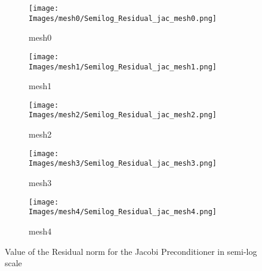 \begin{figure}[htbp]
    \centering
    \begin{subfigure}{0.45\textwidth}
        \centering
        \texttt{[image: Images/mesh0/Semilog\_Residual\_jac\_mesh0.png]}
        \caption{mesh0}
    \end{subfigure}
    \hfill
    \begin{subfigure}{0.45\textwidth}
        \centering
        \texttt{[image: Images/mesh1/Semilog\_Residual\_jac\_mesh1.png]}
        \caption{mesh1}
    \end{subfigure}
    \hfill
    \begin{subfigure}{0.45\textwidth}
        \centering
        \texttt{[image: Images/mesh2/Semilog\_Residual\_jac\_mesh2.png]}
        \caption{mesh2}
    \end{subfigure}

    \vspace{1em} %

    \begin{subfigure}{0.45\textwidth}
        \centering
        \texttt{[image: Images/mesh3/Semilog\_Residual\_jac\_mesh3.png]}
        \caption{mesh3}
    \end{subfigure}
    \hfill
    \begin{subfigure}{0.45\textwidth}
        \centering
        \texttt{[image: Images/mesh4/Semilog\_Residual\_jac\_mesh4.png]}
        \caption{mesh4}
    \end{subfigure}

    \caption{Value of the Residual norm for the Jacobi Preconditioner in semi-log scale}
    \label{fig: Residual normal jacobi}
\end{figure}

 
